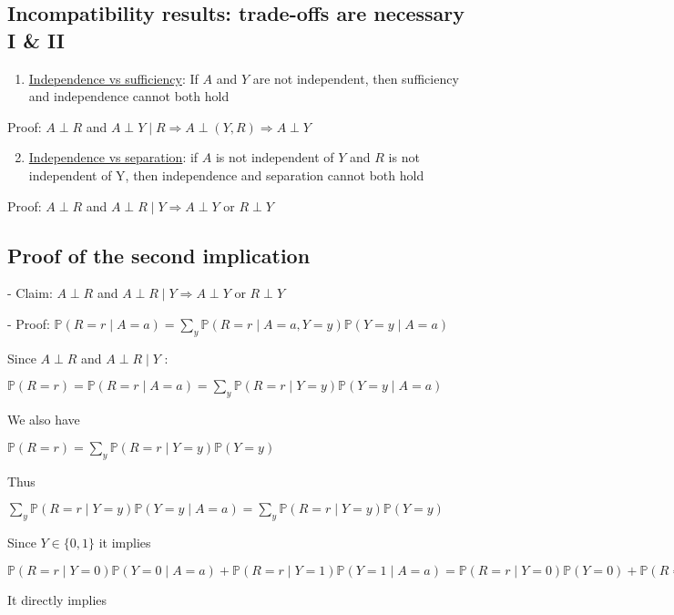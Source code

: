 \subsection*{Incompatibility results: trade-offs are necessary I \& II}
\begin{enumerate}
  \item \underline{Independence vs sufficiency}: If $A$ and $Y$ are not independent, then sufficiency and independence cannot both hold
\end{enumerate}

Proof: $A \perp R$ and $A \perp Y \mid R \Longrightarrow A \perp(Y, R) \Longrightarrow A \perp Y$

\begin{enumerate}
  \setcounter{enumi}{1}
  \item \underline{Independence vs separation}: if $A$ is not independent of $Y$ and $R$ is not independent of $\mathrm{Y}$, then independence and separation cannot both hold
\end{enumerate}

Proof: $A \perp R$ and $A \perp R \mid Y \Longrightarrow A \perp Y$ or $R \perp Y$

\subsection*{Proof of the second implication}
- Claim: $A \perp R$ and $A \perp R \mid Y \Longrightarrow A \perp Y$ or $R \perp Y$

- Proof: $\mathbb{P}(R=r \mid A=a)=\sum_{y} \mathbb{P}(R=r \mid A=a, Y=y) \mathbb{P}(Y=y \mid A=a)$

Since $A \perp R$ and $A \perp R \mid Y$ :

$\mathbb{P}(R=r)=\mathbb{P}(R=r \mid A=a)=\sum_{y} \mathbb{P}(R=r \mid Y=y) \mathbb{P}(Y=y \mid A=a)$

We also have

$
\mathbb{P}(R=r)=\sum_{y} \mathbb{P}(R=r \mid Y=y) \mathbb{P}(Y=y)
$

Thus

$
\sum_{y} \mathbb{P}(R=r \mid Y=y) \mathbb{P}(Y=y \mid A=a)=\sum_{y} \mathbb{P}(R=r \mid Y=y) \mathbb{P}(Y=y)
$

Since $Y \in\{0,1\}$ it implies

$
\mathbb{P}(R=r \mid Y=0) \mathbb{P}(Y=0 \mid A=a)+\mathbb{P}(R=r \mid Y=1) \mathbb{P}(Y=1 \mid A=a) 
=\mathbb{P}(R=r \mid Y=0) \mathbb{P}(Y=0)+\mathbb{P}(R=r \mid Y=1) \mathbb{P}(Y=1)
$

It directly implies

